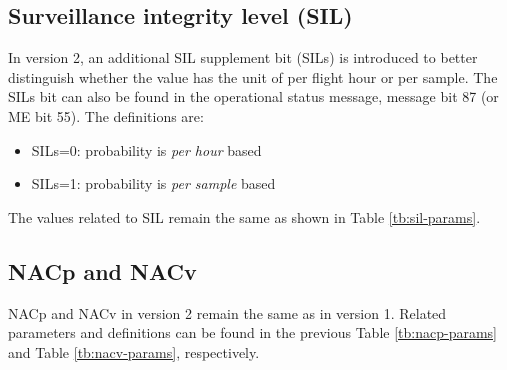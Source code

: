 \subsection{Surveillance integrity level (SIL)}

In version 2, an additional SIL supplement bit (SILs) is introduced to better distinguish whether the value has the unit of per flight hour or per sample. The SILs bit can also be found in the operational status message, message bit 87 (or ME bit 55). The definitions are:

\begin{itemize}
  \item SILs=0: probability is \emph{per hour} based
  \item SILs=1: probability is \emph{per sample} based
\end{itemize}


The values related to SIL remain the same as shown in Table \ref{tb:sil-params}.

\subsection{NACp and NACv}

NACp and NACv in version 2 remain the same as in version 1. Related parameters and definitions can be found in the previous Table \ref{tb:nacp-params} and Table \ref{tb:nacv-params}, respectively.

